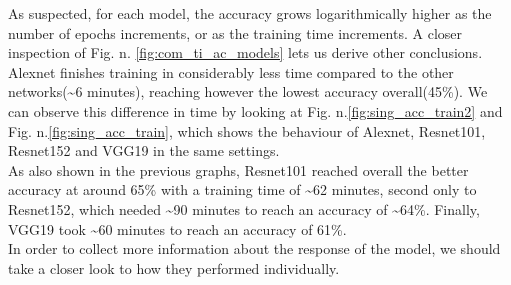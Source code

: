 As suspected, for each model, the accuracy grows logarithmically higher as the number of  epochs increments, or as the training time increments. A closer inspection of Fig. n. \ref{fig:com_ti_ac_models} lets us derive other conclusions. Alexnet finishes training in considerably less time compared to the other networks(\textasciitilde 6 minutes), reaching however the lowest accuracy overall(45\%). We can observe this difference in time by looking at Fig. n.\ref{fig:sing_acc_train2} and Fig. n.\ref{fig:sing_acc_train}, which shows the behaviour of Alexnet, Resnet101, Resnet152 and VGG19 in the same settings. \\
As also shown in the previous graphs, Resnet101 reached overall the better accuracy at around 65\% with a training time of \textasciitilde 62 minutes, second only to Resnet152, which needed  \textasciitilde 90 minutes to reach an accuracy of \textasciitilde 64\%. Finally, VGG19 took \textasciitilde 60 minutes to reach an accuracy of 61\%. \\
In order to collect more information about the response of the model, we should take a closer look to how they performed individually.\\

